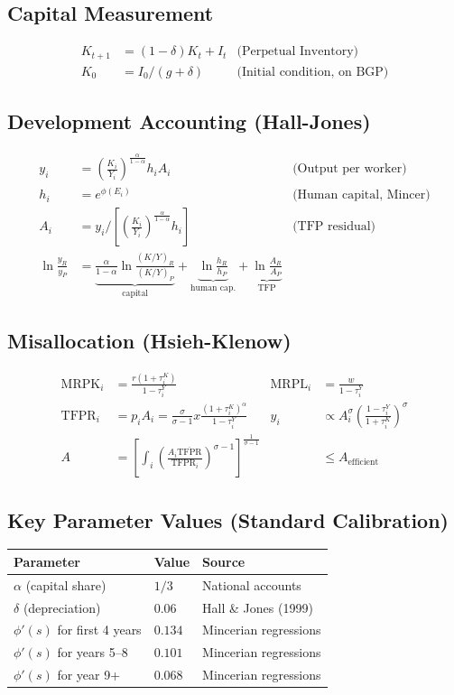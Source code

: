 \documentclass[a4paper,11pt]{article}
\newcommand{\MRPK}{\mathrm{MRPK}}
\newcommand{\MRPL}{\mathrm{MRPL}}
\newcommand{\TFPR}{\mathrm{TFPR}}
\begin{document}
\subsection*{Capital Measurement}
\begin{align*}
K_{t+1} &= (1-\delta)K_t + I_t & \text{(Perpetual Inventory)} \\
K_0 &= I_0 / (g+\delta) & \text{(Initial condition, on BGP)}
\end{align*}

\subsection*{Development Accounting (Hall-Jones)}
\begin{align*}
y_i &= \left(\frac{K_i}{Y_i}\right)^{\frac{\alpha}{1-\alpha}} h_i A_i & \text{(Output per worker)} \\
h_i &= e^{\phi(E_i)} & \text{(Human capital, Mincer)} \\
A_i &= y_i \Big/ \left[\left(\frac{K_i}{Y_i}\right)^{\frac{\alpha}{1-\alpha}} h_i\right] & \text{(TFP residual)} \\
\ln\frac{y_R}{y_P} &= \underbrace{\tfrac{\alpha}{1-\alpha}\ln\frac{(K/Y)_R}{(K/Y)_P}}_{\text{capital}} + \underbrace{\ln\frac{h_R}{h_P}}_{\text{human cap.}} + \underbrace{\ln\frac{A_R}{A_P}}_{\text{TFP}} &
\end{align*}

\subsection*{Misallocation (Hsieh-Klenow)}
\begin{align*}
\MRPK_i &= \frac{r(1+\tau_i^K)}{1-\tau_i^Y} & \MRPL_i &= \frac{w}{1-\tau_i^Y} \\
\TFPR_i &= p_i A_i = \frac{\sigma}{\sigma-1}x\frac{(1+\tau_i^K)^\alpha}{1-\tau_i^Y} & y_i &\propto A_i^\sigma \left(\frac{1-\tau_i^Y}{1+\tau_i^K}\right)^\sigma \\
A &= \left[\int_i \left(\frac{A_i \overline{\TFPR}}{\TFPR_i}\right)^{\sigma-1}\right]^{\frac{1}{\sigma-1}} & & \leq A_{\text{efficient}}
\end{align*}

\subsection*{Key Parameter Values (Standard Calibration)}
\begin{center}
\begin{tabular}{lll}
\toprule
Parameter & Value & Source \\
\midrule
$\alpha$ (capital share) & $1/3$ & National accounts \\
$\delta$ (depreciation) & $0.06$ & Hall \& Jones (1999) \\
$\phi'(s)$ for first 4 years & $0.134$ & Mincerian regressions \\
$\phi'(s)$ for years 5--8 & $0.101$ & Mincerian regressions \\
$\phi'(s)$ for year 9+ & $0.068$ & Mincerian regressions \\
\bottomrule
\end{tabular}
\end{center}
\end{document}
